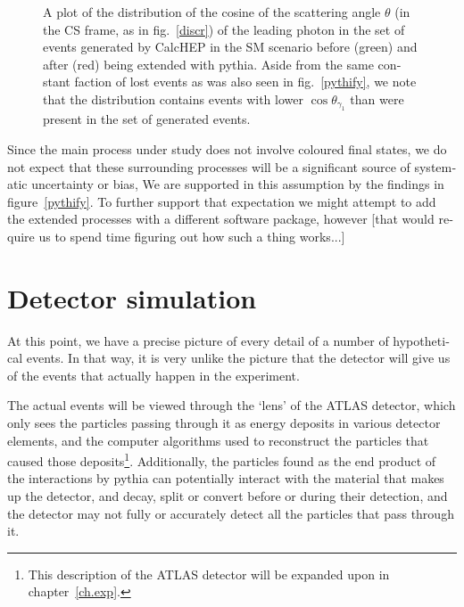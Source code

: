 \begin{english}
\begin{figure}[hbt]
\begin{minipage}[b]{.65\textwidth}
\begin{infilsf} \tiny \makebox[0pt][l]{
\hspace{-1em}
}\end{infilsf}
\end{minipage}
\hfill\begin{minipage}[b]{.3\textwidth}
\caption{A plot of the distribution of the cosine of the scattering angle $\theta$ (in the CS frame, as in fig.~\ref{discr}) of the leading photon in the set of events generated by CalcHEP in the SM scenario before (green) and after (red) being extended with pythia. Aside from the same constant faction of lost events as was also seen in fig.~\ref{pythify}, we note that the distribution contains events with lower $\cos\theta_{\gamma_1}$ than were present in the set of generated events.
\label{pythicos}}
\end{minipage}
\end{figure}

Since the main process under study does not involve coloured final states, we do not expect that these surrounding processes will be a significant source of systematic uncertainty or bias, We are supported in this assumption by the findings in figure~\ref{pythify}. To further support that expectation we might attempt to add the extended processes with a different software package, however [that would require us to spend time figuring out how such a thing works...]

\section{Detector simulation}
At this point, we have a precise picture of every detail of a number of hypothetical events. In that way, it is very unlike the picture that the detector will give us of the events that actually happen in the experiment.

The actual events will be viewed through the `lens' of the ATLAS detector, which only sees the particles passing through it as energy deposits in various detector elements, and the computer algorithms used to reconstruct the particles that caused those deposits\footnote{This description of the ATLAS detector will be expanded upon in chapter~\ref{ch.exp}.}. Additionally, the particles found as the end product of the interactions by pythia can potentially interact with the material that makes up the detector, and decay, split or convert before or during their detection, and the detector may not fully or accurately detect all the particles that pass through it.


\end{english}

